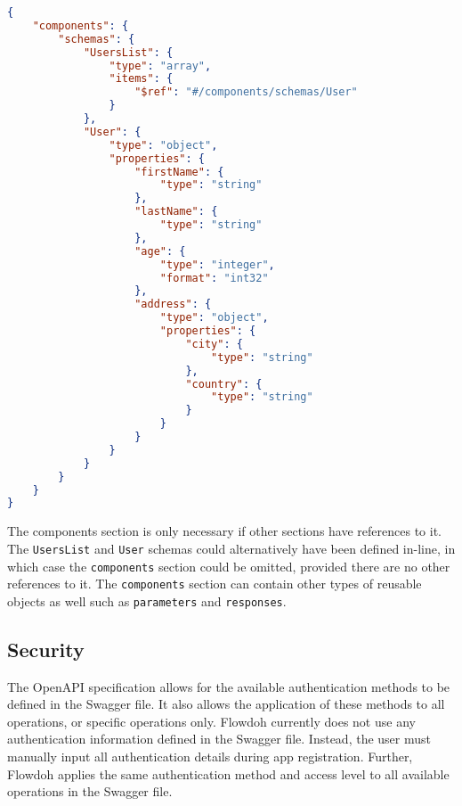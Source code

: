 \begin{lstlisting}[caption={Components section with schemas},label={code:components},language=json]
{
    "components": {
        "schemas": {
            "UsersList": {
                "type": "array",
                "items": {
                    "$ref": "#/components/schemas/User"
                }
            },
            "User": {
                "type": "object",
                "properties": {
                    "firstName": {
                        "type": "string"
                    },
                    "lastName": {
                        "type": "string"
                    },
                    "age": {
                        "type": "integer",
                        "format": "int32"
                    },
                    "address": {
                        "type": "object",
                        "properties": {
                            "city": {
                                "type": "string"
                            },
                            "country": {
                                "type": "string"
                            }
                        }
                    }
                }
            }
        }
    }
}
\end{lstlisting}
The components section is only necessary if other sections have references to it. The \texttt{UsersList} and \texttt{User} schemas could alternatively have been defined in-line, in which case the \texttt{components} section could be omitted, provided there are no other references to it. The \texttt{components} section can contain other types of reusable objects as well such as \texttt{parameters} and \texttt{responses}.

\subsection{Security}
The OpenAPI specification allows for the available authentication methods to be defined in the Swagger file. It also allows the application of these methods to all operations, or specific operations only. Flowdoh currently does not use any authentication information defined in the Swagger file. Instead, the user must manually input all authentication details during app registration. Further, Flowdoh applies the same authentication method and access level to all available operations in the Swagger file.

